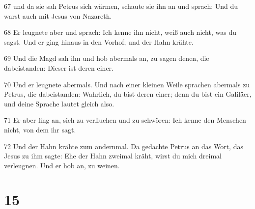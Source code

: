 \par 67 und da sie sah Petrus sich wärmen, schaute sie ihn an und sprach: Und du warst auch mit Jesus von Nazareth.
\par 68 Er leugnete aber und sprach: Ich kenne ihn nicht, weiß auch nicht, was du sagst. Und er ging hinaus in den Vorhof; und der Hahn krähte.
\par 69 Und die Magd sah ihn und hob abermals an, zu sagen denen, die dabeistanden: Dieser ist deren einer.
\par 70 Und er leugnete abermals. Und nach einer kleinen Weile sprachen abermals zu Petrus, die dabeistanden: Wahrlich, du bist deren einer; denn du bist ein Galiläer, und deine Sprache lautet gleich also.
\par 71 Er aber fing an, sich zu verfluchen und zu schwören: Ich kenne den Menschen nicht, von dem ihr sagt.
\par 72 Und der Hahn krähte zum andernmal. Da gedachte Petrus an das Wort, das Jesus zu ihm sagte: Ehe der Hahn zweimal kräht, wirst du mich dreimal verleugnen. Und er hob an, zu weinen.

\chapter{15}

